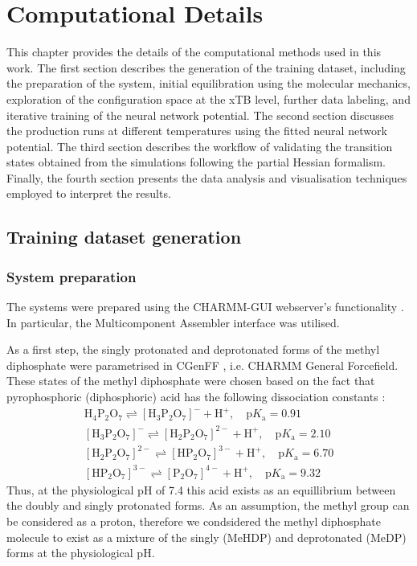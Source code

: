 \chapter{Computational Details}
This chapter provides the details of the computational methods used in this work. The first section describes the generation of the training dataset, including the preparation of the system, initial equilibration using the molecular mechanics, exploration of the configuration space at the xTB level, further data labeling, and iterative training of the neural network potential. The second section discusses the production runs at different temperatures using the fitted neural network potential. The third section describes the workflow of validating the transition states obtained from the simulations following the partial Hessian formalism. Finally, the fourth section presents the data analysis and visualisation techniques employed to interpret the results.


\section{Training dataset generation}

\subsection{System preparation}
The systems were prepared using the CHARMM-GUI webserver's functionality \citep{joCHARMMGUIWebbasedGraphical2008}. In particular, the Multicomponent Assembler interface \citep{kernCHARMMGUIMulticomponentAssembler2024} was utilised. 

As a first step, the singly protonated and deprotonated forms of the methyl diphosphate were parametrised in CGenFF \citep{kimCHARMMGUILigandReader2017}, i.e. CHARMM General Forcefield. These states of the methyl diphosphate were chosen based on the fact that pyrophosphoric (diphosphoric) acid has the following dissociation constants \citep{haynesCRCHandbookChemistry2016}:
\begin{align*}
    \mathrm{H_4P_2O_7} \rightleftharpoons \mathrm{[H_3P_2O_7]^-} + \mathrm{H^+},\quad \mathrm{p}K_\mathrm{a} = 0.91 \\
    \mathrm{[H_3P_2O_7]^-} \rightleftharpoons \mathrm{[H_2P_2O_7]^{2-}} + \mathrm{H^+},\quad \mathrm{p}K_\mathrm{a} = 2.10 \\
    \mathrm{[H_2P_2O_7]^{2-}} \rightleftharpoons \mathrm{[HP_2O_7]^{3-}} + \mathrm{H^+},\quad \mathrm{p}K_\mathrm{a} = 6.70 \\
    \mathrm{[HP_2O_7]^{3-}} \rightleftharpoons \mathrm{[P_2O_7]^{4-}} + \mathrm{H^+},\quad \mathrm{p}K_\mathrm{a} = 9.32
\end{align*}
Thus, at the physiological pH of 7.4 this acid exists as an equillibrium between the doubly and singly protonated forms. As an assumption, the methyl group can be considered as a proton, therefore we condsidered the methyl diphosphate molecule to exist as a mixture of the singly (MeHDP) and deprotonated (MeDP) forms at the physiological pH.

